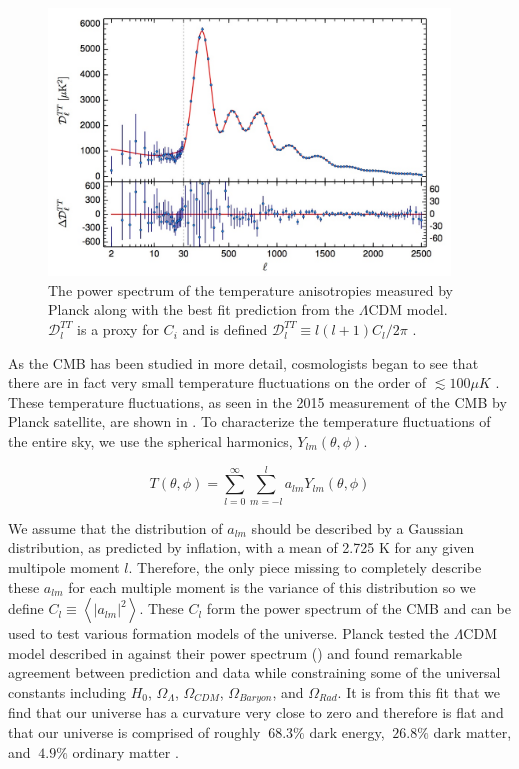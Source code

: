 \begin{figure}[ht]
	\centering
	\includegraphics[width=0.95\textwidth]{planck_2015_power_spectrum}
	\caption{The power spectrum of the temperature anisotropies measured by Planck along with the best fit prediction from the $\Lambda$CDM model.  $\mathcal{D}_l^{TT}$ is a proxy for $C_i$ and is defined $\mathcal{D}_l^{TT} \equiv l(l+1)C_l / 2 \pi$ \cite{Ade2015}.}
	\label{fig:planck_fit}
\end{figure}


As the CMB has been studied in more detail, cosmologists began to see that there are in fact very small temperature fluctuations on the order of ${\lesssim}100 \mu K$ \cite{bennett1996four, komatsu2011seven, Ade2015}.  These temperature fluctuations, as seen in the 2015 measurement of the CMB by Planck satellite, are shown in .  To characterize the temperature fluctuations of the entire sky, we use the spherical harmonics, $Y_{lm}(\theta, \phi)$.  


\begin{equation}
	T(\theta, \phi) = \sum_{l=0}^{\infty} \sum_{m=-l}^{l} a_{lm} Y_{lm}(\theta, \phi)
\end{equation}

We assume that  the distribution of $a_{lm}$ should be described by a Gaussian distribution, as predicted by inflation, with a mean of 2.725 K for any given multipole moment $l$.  Therefore, the only piece missing to completely describe these $a_{lm}$ for each multiple moment is the variance of  this distribution so we define $C_l \equiv \left<| a_{lm}|^2\right>$.  These $C_l$ form the power spectrum of the CMB and can be used to test various formation models of the universe.  Planck tested the $\Lambda$CDM model described in  against their power spectrum () and found remarkable agreement between prediction and data while constraining some of the universal constants including $H_0$, $\Omega_{\Lambda}$, $\Omega_{CDM}$, $\Omega_{Baryon}$, and $\Omega_{Rad}$.  It is from this fit that we find that our universe has a curvature very close to zero and therefore is flat and that our universe is comprised of roughly  $~68.3\%$ dark energy, $~26.8\%$ dark matter, and $~4.9\%$ ordinary matter \cite{Ade2015}.

